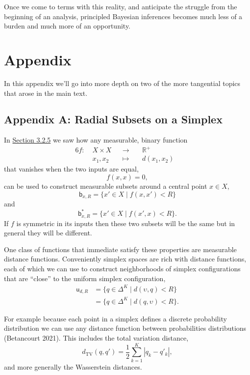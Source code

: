 \documentclass[
  letterpaper,
  DIV=11,
  numbers=noendperiod]{scrartcl}
\begin{document}
Once we come to terms with this reality, and anticipate the struggle
from the beginning of an analysis, principled Bayesian inferences
becomes much less of a burden and much more of an opportunity.

\section*{Appendix}\label{appendix}

In this appendix we'll go into more depth on two of the more tangential
topics that arose in the main text.

\subsection*{Appendix A: Radial Subsets on a
Simplex}\label{sec:appendixa}

In \href{@sec:effective_direct}{Section 3.2.5} we saw how any
measurable, binary function \begin{alignat*}{6}
f :\; & X \times X & &\rightarrow& \; & \mathbb{R}^{+} &
\\
& x_{1}, x_{2} & &\mapsto& & d(x_{1}, x_{2}) &
\end{alignat*} that vanishes when the two inputs are equal, \[
f(x, x) = 0,
\] can be used to construct measurable subsets around a central point
\(x \in X\), \[
\mathsf{b}_{x, R}
=
\{ x' \in X \mid f(x, x') < R \}
\] and \[
\mathsf{b}^{*}_{x, R}
=
\{ x' \in X \mid f(x', x) < R \}.
\] If \(f\) is symmetric in its inputs then these two subsets will be
the same but in general they will be different.

One class of functions that immediate satisfy these properties are
measurable distance functions. Conveniently simplex spaces are rich with
distance functions, each of which we can use to construct neighborhoods
of simplex configurations that are ``close'' to the uniform simplex
configuration, \begin{align*}
\mathsf{u}_{d, R}
&=
\{ q \in \Delta^{K} \mid d(\upsilon, q) < R \}
\\
&=
\{ q \in \Delta^{K} \mid d(q, \upsilon) < R \}.
\end{align*}

For example because each point in a simplex defines a discrete
probability distribution we can use any distance function between
probabilities distributions (Betancourt 2021). This includes the total
variation distance, \[
d_{\mathrm{TV}}(q, q')
=
\frac{1}{2} \sum_{k = 1}^{K} | q_{k} - q'_{k} |,
\] and more generally the Wasserstein distances.
\end{document}
